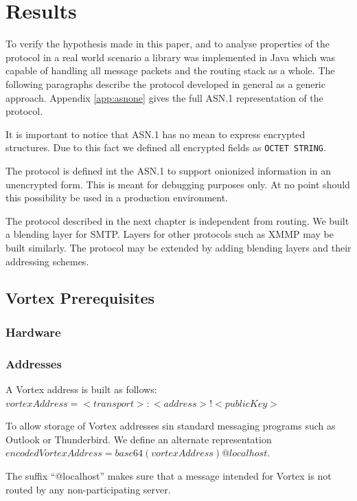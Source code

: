 
\part{Results}
To verify the hypothesis made in this paper, and to analyse properties of the protocol in a real world scenario a library was implemented in Java which was capable of handling all message packets and the routing stack as a whole. The following paragraphs describe the protocol developed in general as a generic approach. Appendix \ref{app:asnone} gives the full ASN.1 representation of the protocol. 

It is important to notice that ASN.1 has no mean to express encrypted structures. Due to this fact we defined all encrypted fields as \verb|OCTET STRING|. 

The protocol is defined int the ASN.1 to support onionized information in an unencrypted form. This is meant for debugging purposes only. At no point should this possibility be used in a production environment.

The protocol described in the next chapter is independent from routing. We built a blending layer for SMTP. Layers for other protocols such as XMMP may be built similarly. The protocol may be extended by adding blending layers and their addressing schemes.

\chapter{Vortex Prerequisites}
\section{Hardware}


\section{Addresses}
A Vortex address is built as follows: $vortexAddress=<transport>:<address>!<publicKey>$

To allow storage of Vortex addresses sin standard messaging programs such as Outlook or Thunderbird. We define an alternate representation $encodedVortexAddress=base64(vortexAddress)@localhost$. 

The suffix ``@localhost'' makes sure that a message intended for Vortex is not routed by any non-participating server.

